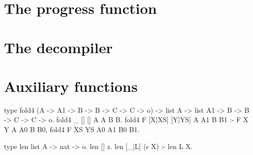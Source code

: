 \section{The progress function}

\section{The decompiler}

\section{Auxiliary functions}

\begin{elpicode}
  type fold4 (A -> A1 -> B -> B -> C -> C -> o) -> list A -> list A1 -> B -> B -> C -> C -> o.
  fold4 _ [] [] A A B B.
  fold4 F [X|XS] [Y|YS] A A1 B B1 :- F X Y A A0 B B0, fold4 F XS YS A0 A1 B0 B1.
  
  type len list A -> nat -> o.
  len [] z.
  len [_|L] (s X) :- len L X.
  
  \end{elpicode}
  